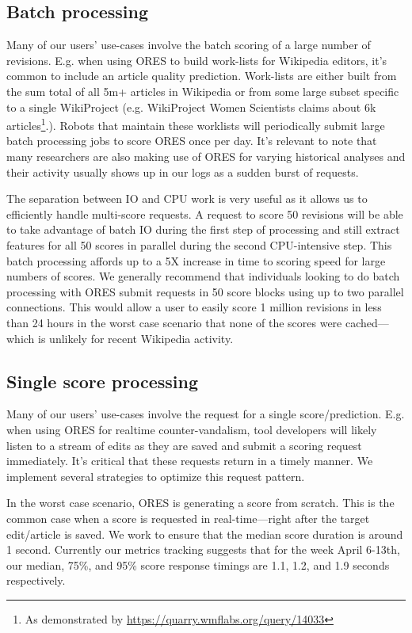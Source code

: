 \subsection{Batch processing}
Many of our users' use-cases involve the batch scoring of a large number of revisions.  E.g. when using ORES to build work-lists for Wikipedia editors, it's common to include an article quality prediction.  Work-lists are either built from the sum total of all 5m+ articles in Wikipedia or from some large subset specific to a single WikiProject (e.g. WikiProject Women Scientists claims about 6k articles\footnote{As demonstrated by \url{https://quarry.wmflabs.org/query/14033}}.).  Robots that maintain these worklists will periodically submit large batch processing jobs to score ORES once per day.  It's relevant to note that many researchers are also making use of ORES for varying historical analyses and their activity usually shows up in our logs as a sudden burst of requests.

The separation between IO and CPU work is very useful as it allows us to efficiently handle multi-score requests.  A request to score 50 revisions will be able to take advantage of batch IO during the first step of processing and still extract features for all 50 scores in parallel during the second CPU-intensive step.  This batch processing affords up to a 5X increase in time to scoring speed for large numbers of scores\cite{sarabadani2017building}.  We generally recommend that individuals looking to do batch processing with ORES submit requests in 50 score blocks using up to two parallel connections.  This would allow a user to easily score 1 million revisions in less than 24 hours in the worst case scenario that none of the scores were cached---which is unlikely for recent Wikipedia activity.

\subsection{Single score processing}
Many of our users' use-cases involve the request for a single score/prediction.  E.g. when using ORES for realtime counter-vandalism, tool developers will likely listen to a stream of edits as they are saved and submit a scoring request immediately.  It's critical that these requests return in a timely manner.  We implement several strategies to optimize this request pattern.

In the worst case scenario, ORES is generating a score from scratch.  This is the common case when a score is requested in real-time---right after the target edit/article is saved.  We work to ensure that the median score duration is around 1 second.  Currently our metrics tracking suggests that for the week April 6-13th, our median, 75\%, and 95\% score response timings are 1.1, 1.2, and 1.9 seconds respectively.

